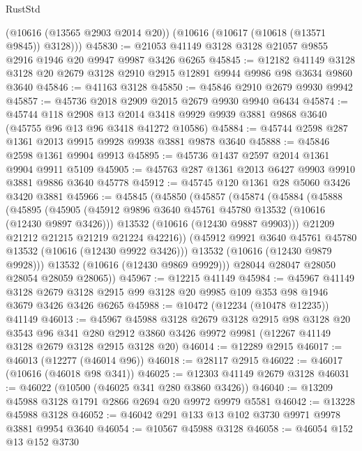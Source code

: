 \begin{lexlean}{RustStd}
\begin{coremodule}
      (@10616 (@13565 @2903 @2014 @20))
      (@10616 (@10617 (@10618 (@13571 @9845)) @3128)))
@45830 := @21053 @41149 @3128 @3128 @21057 @9855 @2916 @1946 @20 @9947 @9987 @3426 @6265
@45845 := @12182
    @41149
    @3128
    @3128
    @20
    @2679
    @3128
    @2910
    @2915
    @12891
    @9944
    @9986
    @98
    @3634
    @9860
    @3640
@45846 := @41163 @3128
@45850 := @45846 @2910 @2679 @9930 @9942
@45857 := @45736 @2018 @2909 @2015 @2679 @9930 @9940 @6434
@45874 := @45744
    @118
    @2908
    @13
    @2014
    @3418
    @9929
    @9939
    @3881
    @9868
    @3640
    (@45755 @96 @13 @96 @3418 @41272 @10586)
@45884 := @45744 @2598 @287 @1361 @2013 @9915 @9928 @9938 @3881 @9878 @3640
@45888 := @45846 @2598 @1361 @9904 @9913
@45895 := @45736 @1437 @2597 @2014 @1361 @9904 @9911 @5109
@45905 := @45763 @287 @1361 @2013 @6427 @9903 @9910 @3881 @9886 @3640 @45778
@45912 := @45745 @120 @1361 @28 @5060 @3426 @3420 @3881
@45966 := @45845
    (@45850
      (@45857
        (@45874
          (@45884
            (@45888
              (@45895
                (@45905
                  (@45912 @9896 @3640 @45761 @45780 @13532 (@10616 (@12430 @9897 @3426)))
                  @13532
                  (@10616 (@12430 @9887 @9903)))
                @21209
                @21212
                @21215
                @21219
                @21224
                @42216))
            (@45912 @9921 @3640 @45761 @45780 @13532 (@10616 (@12430 @9922 @3426)))
            @13532
            (@10616 (@12430 @9879 @9928)))
          @13532
          (@10616 (@12430 @9869 @9929)))
        @28044
        @28047
        @28050
        @28054
        @28059
        @28065))
@45967 := @12215 @41149
@45984 := @45967
    @41149
    @3128
    @2679
    @3128
    @2915
    @99
    @3128
    @20
    @9985
    @109
    @353
    @98
    @1946
    @3679
    @3426
    @3426
    @6265
@45988 := @10472 (@12234 (@10478 @12235)) @41149
@46013 := @45967
    @45988
    @3128
    @2679
    @3128
    @2915
    @98
    @3128
    @20
    @3543
    @96
    @341
    @280
    @2912
    @3860
    @3426
    @9972
    @9981
    (@12267 @41149 @3128 @2679 @3128 @2915 @3128 @20)
@46014 := @12289 @2915
@46017 := @46013 (@12277 (@46014 @96))
@46018 := @28117 @2915
@46022 := @46017 (@10616 (@46018 @98 @341))
@46025 := @12303 @41149 @2679 @3128
@46031 := @46022 (@10500 (@46025 @341 @280 @3860 @3426))
@46040 := @13209 @45988 @3128 @1791 @2866 @2694 @20 @9972 @9979 @5581
@46042 := @13228 @45988 @3128
@46052 := @46042 @291 @133 @13 @102 @3730 @9971 @9978 @3881 @9954 @3640
@46054 := @10567 @45988 @3128
@46058 := @46054 @152 @13 @152 @3730

\end{coremodule}
\end{lexlean}
